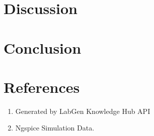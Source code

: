 \documentclass[12pt,a4paper]{article}
\begin{document}
\section{Discussion}


\section{Conclusion}


\section{References}
\begin{enumerate}

    \item Generated by LabGen Knowledge Hub API

    \item Ngspice Simulation Data.

\end{enumerate}
\end{document}
